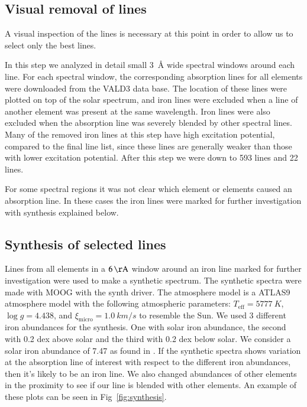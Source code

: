 \documentclass{aa}
\begin{document}
\subsection{Visual removal of lines}
\label{sub:visual_removal_of_lines}

A visual inspection of the lines is necessary at this point in order to
allow us to select only the best lines.

In this step we analyzed in detail small \SI{3}{\angstrom} wide spectral
windows around each line. For each spectral window, the corresponding
absorption lines for all elements were downloaded from the VALD3 data
base. The location of these lines were plotted on top of the solar
spectrum, and iron lines were excluded when a line of another element
was present at the same wavelength. Iron lines were also excluded when
the absorption line was severely blended by other spectral lines. Many
of the removed iron lines at this step have high excitation potential,
compared to the final line list, since these lines are generally weaker
than those with lower excitation potential. After this step we were down
to 593  lines and 22  lines.

For some spectral regions it was not clear which element or elements
caused an absorption line. In these cases the iron lines were marked for
further investigation with synthesis explained below.


\subsection{Synthesis of selected lines}
\label{sub:synthesis_of_selected_lines}

Lines from all elements in a $\SI{6}{\AA}$ window around an iron line
marked for further investigation were used to make a synthetic spectrum.
The synthetic spectra were made with MOOG with the synth driver. The
atmosphere model is a ATLAS9 atmosphere model \citep{Kurucz1993} with
the following atmospheric parameters: $T_\mathrm{eff}=\SI{5777}{K}$,
$\log g = 4.438$, and $\xi_\mathrm{micro} = \SI{1.0}{km/s}$ to resemble
the Sun. We used 3 different iron abundances for the synthesis. One
with solar iron abundance, the second with 0.2 dex above solar and the
third with 0.2 dex below solar. We consider a solar iron abundance
of 7.47 as found in \cite{Gonzalez2000}. If the synthetic spectra
shows variation at the absorption line of interest with respect to the
different iron abundances, then it's likely to be an iron line. We also
changed abundances of other elements in the proximity to see if our line
is blended with other elements. An example of these plots can be seen in
Fig~\ref{fig:synthesis}.
\end{document}

